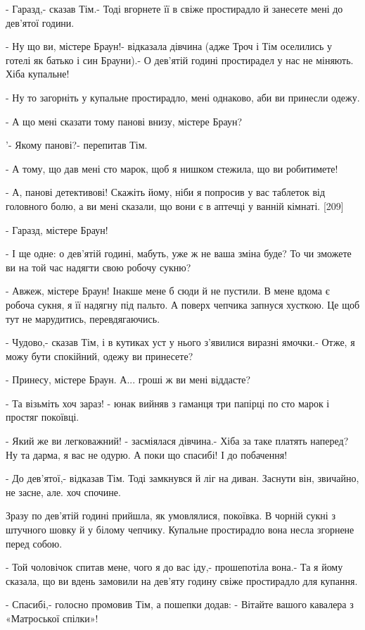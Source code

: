 - Гаразд,- сказав Тім.- Тоді вгорнете її в свіже простирадло й занесете мені до дев'ятої години.

- Ну що ви, містере Браун!- відказала дівчина (адже Троч і Тім оселились у готелі як батько і син Брауни).- О дев'ятій годині простирадел у нас не міняють. Хіба купальне!

- Ну то загорніть у купальне простирадло, мені однаково, аби ви принесли одежу.

- А що мені сказати тому панові внизу, містере Браун?

'- Якому панові?- перепитав Тім.

- А тому, що дав мені сто марок, щоб я нишком стежила, що ви робитимете!

- А, панові детективові! Скажіть йому, ніби я попросив у вас таблеток від головного болю, а ви мені сказали, що вони є в аптечці у ванній кімнаті. [209]

- Гаразд, містере Браун!

- І ще одне: о дев'ятій годині, мабуть, уже ж не ваша зміна буде? То чи зможете ви на той час надягти свою робочу сукню?

- Авжеж, містере Браун! Інакше мене б сюди й не пустили. В мене вдома є робоча сукня, я її надягну під пальто. А поверх чепчика запнуся хусткою. Це щоб тут не марудитись, перевдягаючись.

- Чудово,- сказав Тім, і в кутиках уст у нього з'явилися виразні ямочки.- Отже, я можу бути спокійний, одежу ви принесете?

- Принесу, містере Браун. А... гроші ж ви мені віддасте?

- Та візьміть хоч зараз! - юнак вийняв з гаманця три папірці по сто марок і простяг покоївці.

- Який же ви легковажний! - засміялася дівчина.- Хіба за таке платять наперед? Ну та дарма, я вас не одурю. А поки що спасибі! І до побачення!

- До дев'ятої,- відказав Тім. Тоді замкнувся й ліг на диван. Заснути він, звичайно, не засне, але. хоч спочине.

Зразу по дев'ятій годині прийшла, як умовлялися, покоївка. В чорній сукні з штучного шовку й у білому чепчику. Купальне простирадло вона несла згорнене перед собою.

- Той чоловічок спитав мене, чого я до вас іду,- прошепотіла вона.- Та я йому сказала, що ви вдень замовили на дев'яту годину свіже простирадло для купання.

- Спасибі,- голосно промовив Тім, а пошепки додав: - Вітайте вашого кавалера з «Матроської спілки»!

